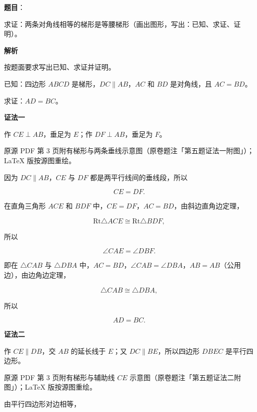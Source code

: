 \begin{answer}

\textbf{题目}：

求证：两条对角线相等的梯形是等腰梯形（画出图形，写出：已知、求证、证明）。

\textbf{解析}

按题面要求写出已知、求证并证明。

已知：四边形 $ABCD$ 是梯形，$DC\parallel AB$，$AC$ 和 $BD$ 是对角线，且 $AC=BD$。

求证：$AD=BC$。

\textbf{证法一}

作 $CE\perp AB$，垂足为 $E$；作 $DF\perp AB$，垂足为 $F$。

\begin{gktip}
原源 PDF 第 3 页附有梯形与两条垂线示意图（原卷题注「第五题证法一附图」）；LaTeX 版按源图重绘。
\end{gktip}
\nopagebreak[4]
\begin{center}\end{center}
\nopagebreak[4]
因为 $DC\parallel AB$，$CE$ 与 $DF$ 都是两平行线间的垂线段，所以

\nopagebreak[4]
\[
CE=DF.
\]

在直角三角形 $ACE$ 和 $BDF$ 中，$CE=DF$，$AC=BD$，由斜边直角边定理，

\nopagebreak[4]
\[
\mathrm{Rt}\triangle ACE\cong\mathrm{Rt}\triangle BDF,
\]

所以

\nopagebreak[4]
\[
\angle CAE=\angle DBF.
\]

即在 $\triangle CAB$ 与 $\triangle DBA$ 中，$AC=BD$，$\angle CAB=\angle DBA$，$AB=AB$（公用边），由边角边定理，

\nopagebreak[4]
\[
\triangle CAB\cong\triangle DBA,
\]

所以

\nopagebreak[4]
\[
AD=BC.
\]

\textbf{证法二}

作 $CE\parallel DB$，交 $AB$ 的延长线于 $E$；又 $DC\parallel BE$，所以四边形 $DBEC$ 是平行四边形。

\begin{gktip}
原源 PDF 第 3 页附有梯形与辅助线 $CE$ 示意图（原卷题注「第五题证法二附图」）；LaTeX 版按源图重绘。
\end{gktip}
\nopagebreak[4]
\begin{center}\end{center}
\nopagebreak[4]
由平行四边形对边相等，


\end{answer}

